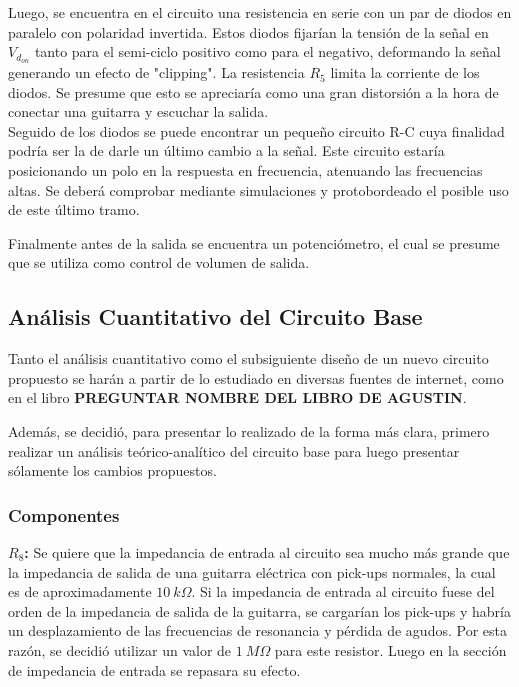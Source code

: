 Luego, se encuentra en el circuito una resistencia en serie con un par de diodos en paralelo con polaridad invertida. Estos diodos fijarían la tensión de la señal en $V_{d_{on}}$ tanto para el semi-ciclo positivo como para el negativo, deformando la señal generando un efecto de "clipping". La resistencia $R_5$ limita la corriente de los diodos. Se presume que esto se apreciaría como una gran distorsión a la hora de conectar una guitarra y escuchar la salida.\\

Seguido de los diodos se puede encontrar un pequeño circuito R-C cuya finalidad podría ser la de darle un último cambio a la señal. Este circuito estaría posicionando un polo en la respuesta en frecuencia, atenuando las frecuencias altas. Se deberá comprobar mediante simulaciones y protobordeado el posible uso de este último tramo.

Finalmente antes de la salida se encuentra un potenciómetro, el cual se presume que se utiliza como control de volumen de salida.

\subsection{Análisis Cuantitativo del Circuito Base}

Tanto el análisis cuantitativo como el subsiguiente diseño de un nuevo circuito propuesto se harán a partir de lo estudiado en diversas fuentes de internet, como en el libro \textbf{PREGUNTAR NOMBRE DEL LIBRO DE AGUSTIN}.

Además, se decidió, para presentar lo realizado de la forma más clara, primero realizar un análisis teórico-analítico del circuito base para luego presentar sólamente los cambios propuestos.\\

\subsubsection{Componentes}

\textbf{$R_8$:} Se quiere que la impedancia de entrada al circuito sea mucho más grande que la impedancia de salida de una guitarra eléctrica con pick-ups normales, la cual es de aproximadamente $10 \ k\Omega$. Si la impedancia de entrada al circuito fuese del orden de la impedancia de salida de la guitarra, se cargarían los pick-ups y habría un desplazamiento de las frecuencias de resonancia y pérdida de agudos. Por esta razón, se decidió utilizar un valor de $1 \ M\Omega$ para este resistor. Luego en la sección de impedancia de entrada se repasara su efecto. \\

